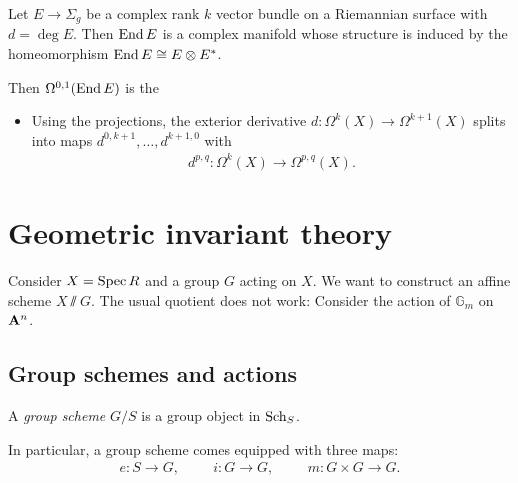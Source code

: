 \documentclass{article}
\begin{document}
\begin{example}
  Let $E\to\Sigma_g$ be a complex rank $k$ vector bundle
  on a Riemannian surface with $d=\deg E$. Then $\operatorname{End} E$ is
  a complex manifold whose structure is induced by the
  homeomorphism $\operatorname{End} E \cong E\otimes E^*$.

  Then $\Omega^{0,1}(\operatorname{End} E)$ is the
\end{example}

\begin{itemize}
  \item Using the projections, the exterior derivative $d:\Omega^k(X)\to\Omega^{k+1}(X)$ splits into maps $d^{0,k+1},\ldots,d^{k+1,0}$ with
    \begin{align*}
      d^{p,q} : \Omega^k(X) \to \Omega^{p,q}(X).
    \end{align*}
\end{itemize}


\section{Geometric invariant theory}

Consider $X=\operatorname{Spec} R$ and a group $G$ acting on $X$. We want to construct
an affine scheme $X \sslash G$. The usual quotient does not work:
Consider the action of $\mathbb{G}_m$ on $\mathbf{A}^{n}_{}$.


\subsection{Group schemes and actions}

\begin{definition}
  A \emph{group scheme} $G/S$ is a group object in $\operatorname{Sch}_S$.
\end{definition}

In particular, a group scheme comes equipped with three maps:
\begin{align*}
  e:S\to G,\hspace{1cm} i:G\to G,\hspace{1cm} m:G\times G\to G.
\end{align*}
\end{document}
